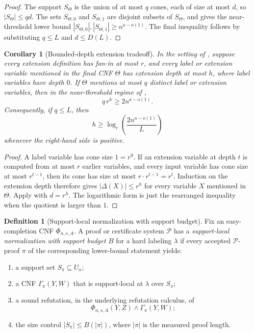 \documentclass[11pt]{article}
\newtheorem{corollary}[theorem]{Corollary}
\theoremstyle{definition}
\newtheorem{definition}[theorem]{Definition}
\begin{document}
\begin{proof}
The support \(S_\Theta\) is the union of at most \(q\) cones, each of size at most \(d\), so \(|S_\Theta|\le qd\).  The sets \(S_{\Theta,0}\) and \(S_{\Theta,1}\) are disjoint subsets of \(S_\Theta\), and  gives the near-threshold lower bound \(|S_{\Theta,0}|,|S_{\Theta,1}|\ge n^{a-o(1)}\).  The final inequality follows by substituting \(q\le L\) and \(d\le D(L)\).
\end{proof}

\begin{corollary}[Bounded-depth extension tradeoff]\label{cor:bounded-depth-extension}
In the setting of , suppose every extension definition has fan-in at most \(r\), and every label or extension variable mentioned in the final CNF \(\Theta\) has extension depth at most \(h\), where label variables have depth \(0\).  If \(\Theta\) mentions at most \(q\) distinct label or extension variables, then in the near-threshold regime of ,
\[
  q\,r^h\ge 2n^{a-o(1)}.
\]
Consequently, if \(q\le L\), then
\[
  h\ge \log_r\!\left(\frac{2n^{a-o(1)}}{L}\right)
\]
whenever the right-hand side is positive.
\end{corollary}

\begin{proof}
A label variable has cone size \(1=r^0\).  If an extension variable at depth \(t\) is computed from at most \(r\) earlier variables, and every input variable has cone size at most \(r^{t-1}\), then its cone has size at most \(r\cdot r^{t-1}=r^t\).  Induction on the extension depth therefore gives \(|\Delta(X)|\le r^h\) for every variable \(X\) mentioned in \(\Theta\).  Apply  with \(d=r^h\).  The logarithmic form is just the rearranged inequality when the quotient is larger than \(1\).
\end{proof}

\begin{definition}[Support-local normalization with support budget]\label{def:support-local-normalizer}
Fix an easy-completion CNF \(\Phi_{n,s,A}\).  A proof or certificate system \(\mathcal P\) has a \emph{support-local normalization with support budget \(B\)} for a hard labeling \(\lambda\) if every accepted \(\mathcal P\)-proof \(\pi\) of the corresponding lower-bound statement yields:
\begin{enumerate}
  \item a support set \(S_\pi\subseteq U_n\);
  \item a CNF \(\Gamma_\pi(Y,W)\) that is support-local at \(\lambda\) over \(S_\pi\);
  \item a sound refutation, in the underlying refutation calculus, of
  \[
    \Phi_{n,s,A}(Y,Z)\wedge\Gamma_\pi(Y,W);
  \]
  \item the size control \(|S_\pi|\le B(|\pi|)\), where \(|\pi|\) is the measured proof length.
\end{enumerate}
\end{definition}
\end{document}
